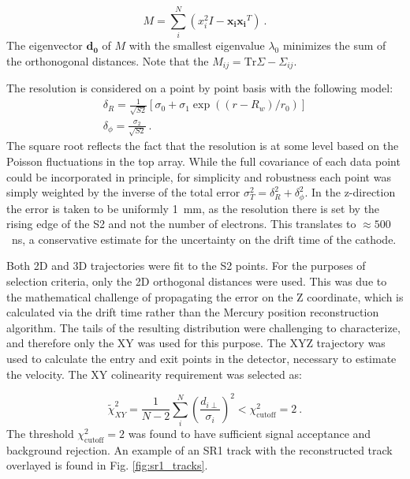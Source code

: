 \begin{enumerate}
    \begin{equation}
        M = \sum_i^N( x_i^2 I - \mathbf{x_i}\mathbf{x_i}^T)~.
    \end{equation}
    \noindent
    The eigenvector $\mathbf{d_0}$ of $M$ with the smallest eigenvalue $\lambda_0$ minimizes the sum of the orthonogonal distances.
    Note that the $M_{ij} = \text{Tr}\Sigma - \Sigma_{ij}$. 
    
    The resolution is considered on a point by point basis with the following model:
    \begin{align}
        \delta_R = \frac{1}{\sqrt{S2}}[\sigma_0 + \sigma_1\exp((r - R_w)/r_0)]\\
                \delta_\phi = \frac{\sigma_2}{\sqrt{S2}}~.
    \end{align}
    \noindent
    The square root reflects the fact that the resolution is at some level based on the Poisson fluctuations in the top array.
    While the full covariance of each data point could be incorporated in principle, for simplicity and robustness each point was simply weighted by the inverse of the total error $\sigma_T^2 = \delta_R^2 + \delta^2_{\phi}$.
    In the z-direction the error is taken to be uniformly 1~mm, as the resolution there is set by the rising edge of the S2 and not the number of electrons.
    This translates to $\approx 500$~ns, a conservative estimate for the uncertainty on the drift time of the cathode.
    
    Both 2D and 3D trajectories were fit to the S2 points.
    For the purposes of selection criteria, only the 2D orthogonal distances were used.
    This was due to the mathematical challenge of propagating the error on the Z coordinate, which is calculated via the drift time rather than the Mercury position reconstruction algorithm\cite{lux_collaboration_position_2018}. 
    The tails of the resulting distribution were challenging to characterize, and therefore only the XY was used for this purpose.
    The XYZ trajectory was used to calculate the entry and exit points in the detector, necessary to estimate the velocity.
    The XY colinearity requirement was selected as:
    
    \begin{equation}
        \tilde \chi^2_{XY} = \frac{1}{N-2}\sum_i^N(\frac{ d_{i\perp} }{\sigma_i})^2 < \chi^2_{\text{cutoff}} = 2 ~.
    \end{equation}
  \noindent
    The  threshold $\chi^2_{\text{cutoff}} = 2 $ was found to have sufficient signal acceptance and background rejection.
    An example of an SR1 track with the reconstructed track overlayed is found in Fig. \ref{fig:sr1_tracks}.
    

\end{enumerate}

